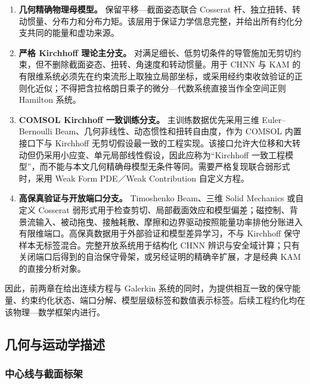 \begin{enumerate}
\def\labelenumi{\arabic{enumi}.}
\tightlist
\item
  \textbf{几何精确物理母模型。} 保留平移---截面姿态联合 Cosserat 杆、独立扭转、转动惯量、分布力和分布力矩。该层用于保证力学信息完整，并给出所有约化分支共同的能量和虚功来源\cite{Simo1985FiniteStrainBeam,Antman2005Elasticity}。
\item
  \textbf{严格 Kirchhoff 理论主分支。} 对满足细长、低剪切条件的导管施加无剪切约束，但不删除截面姿态、扭转、角速度和转动惯量。用于 CHNN 与 KAM 的有限维系统必须先在约束流形上取独立局部坐标，或采用经约束收敛验证的正则化近似；不得把含拉格朗日乘子的微分---代数系统直接当作全空间正则 Hamilton 系统。
\item
  \textbf{COMSOL Kirchhoff 一致训练分支。} 主训练数据优先采用三维 Euler--Bernoulli Beam、几何非线性、动态惯性和扭转自由度，作为 COMSOL 内置接口下与 Kirchhoff 无剪切假设最一致的工程实现。该接口允许大位移和大转动但仍采用小应变、单元局部线性假设，因此应称为``Kirchhoff 一致工程模型''，而不能与本文几何精确母模型无条件等同\cite{COMSOLBeamInterface2025,COMSOLGeometricNonlinearity2025,COMSOLSectionStiffness2025}。需要严格复现联合弱形式时，采用 Weak Form PDE／Weak Contribution 自定义方程\cite{COMSOLWeakFormPDE2025,COMSOLWeakContribution2025}。
\item
  \textbf{高保真验证与开放端口分支。} Timoshenko Beam、三维 Solid Mechanics 或自定义 Cosserat 弱形式用于检查剪切、局部截面效应和模型偏差；磁控制、背景流输入、被动拖曳、接触耗散、摩擦和边界驱动按照能量功率排他分账进入有限维端口。高保真数据用于外部验证和模型差异学习，不与 Kirchhoff 保守样本无标签混合。完整开放系统用于结构化 CHNN 辨识与安全域计算；只有关闭端口后得到的自治保守骨架，或另经证明的精确辛扩展，才是经典 KAM 的直接分析对象。
\end{enumerate}

因此，前两章在给出连续方程与 Galerkin 系统的同时，为提供相互一致的保守能量、约束约化状态、端口分解、模型层级标签和数值表示标签。后续工程约化均在该物理---数学框架内进行。

\subsection{几何与运动学描述}\label{sec:rod-1-2}

\subsubsection{中心线与截面标架}\label{sec:rod-1-2-1}

